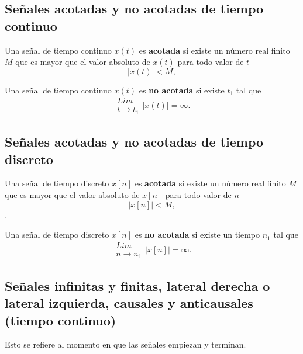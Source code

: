 \subsection{Se\~{n}ales acotadas y no acotadas de tiempo continuo}

Una se\~{n}al de tiempo continuo $x(t)$ es \textbf{acotada} si existe un n\'{u}mero real finito $M$ que
es mayor que el valor absoluto de $x(t)$ para todo valor de $t$
\begin{equation}
  |x(t)| < M,
\end{equation}

Una se\~{n}al de tiempo continuo $x(t)$ es \textbf{no acotada} si
existe $t_{1}$ tal que
\begin{equation}
  \begin{array}{c}
    Lim                     \\
    t \rightarrow t_{1}     
  \end{array}
  |x(t)| = \infty.
\end{equation}

\subsection{Se\~{n}ales acotadas y no acotadas de tiempo discreto}

Una se\~{n}al de tiempo discreto $x[n]$ es \textbf{acotada} si existe un n\'{u}mero real finito $M$ que
es mayor que el valor absoluto de $x[n]$ para todo valor de $n$
\begin{equation}
  |x[n]| < M,
\end{equation}.

Una se\~{n}al de tiempo discreto $x[n]$ es \textbf{no acotada} si
existe un tiempo $n_{1}$ tal que
\begin{equation}
  \begin{array}{c}
    Lim                     \\
    n \rightarrow n_{1}     
  \end{array}
  |x[n]| = \infty.
\end{equation}

\subsection{Se\~{n}ales infinitas y finitas, lateral derecha o lateral
  izquierda, causales y anticausales (tiempo continuo)}

Esto se refiere al momento en que las señales empiezan y terminan.

